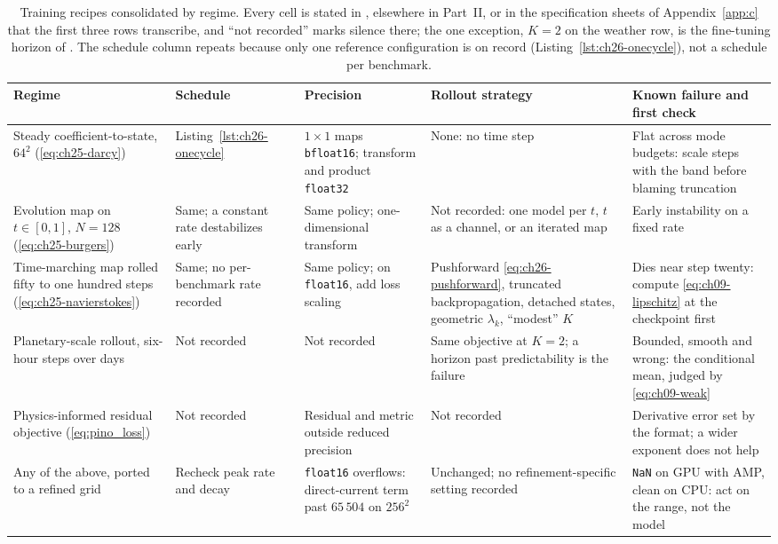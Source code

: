 \begin{table}[t]
\centering
\footnotesize
\caption{Training recipes consolidated by regime. Every cell is stated in
, elsewhere in Part~II, or in
the specification sheets of Appendix~\ref{app:c} that the first three rows transcribe,
and ``not recorded'' marks silence there; the one exception, $K=2$ on the weather
row, is the fine-tuning horizon of
. The schedule column
repeats because only one reference configuration is on record
(Listing~\ref{lst:ch26-onecycle}), not a schedule per benchmark.}
\label{tab:appd-recipes}
\begin{tabularx}{\textwidth}{@{}>{\raggedright\arraybackslash}p{}
  >{\raggedright\arraybackslash}p{}
  >{\raggedright\arraybackslash}p{}
  >{\raggedright\arraybackslash}p{}
  >{\raggedright\arraybackslash}X@{}}
\toprule
\textbf{Regime} & \textbf{Schedule} & \textbf{Precision} & \textbf{Rollout strategy} & \textbf{Known failure and first check} \\
\midrule
Steady coefficient-to-state, $64^2$ (\eqref{eq:ch25-darcy})
& Listing~\ref{lst:ch26-onecycle}
& $1\times1$ maps \texttt{bfloat16}; transform and product \texttt{float32}
& None: no time step
& Flat across mode budgets: scale steps with the band before blaming truncation \\
\addlinespace
Evolution map on $t\in[0,1]$, $N=128$ (\eqref{eq:ch25-burgers})
& Same; a constant rate destabilizes early
& Same policy; one-dimensional transform
& Not recorded: one model per $t$, $t$ as a channel, or an iterated map
& Early instability on a fixed rate \\
\addlinespace
Time-marching map rolled fifty to one hundred steps (\eqref{eq:ch25-navierstokes})
& Same; no per-benchmark rate recorded
& Same policy; on \texttt{float16}, add loss scaling
& Pushforward \eqref{eq:ch26-pushforward}, truncated backpropagation, detached states, geometric $\lambda_k$, ``modest'' $K$
& Dies near step twenty: compute \eqref{eq:ch09-lipschitz} at the checkpoint first \\
\addlinespace
Planetary-scale rollout, six-hour steps over days \cite{pathak2022fourcastnet}
& Not recorded
& Not recorded
& Same objective at $K=2$; a horizon past predictability is the failure
& Bounded, smooth and wrong: the conditional mean, judged by \eqref{eq:ch09-weak} \\
\addlinespace
Physics-informed residual objective (\eqref{eq:pino_loss})
& Not recorded
& Residual and metric outside reduced precision
& Not recorded
& Derivative error set by the format; a wider exponent does not help \\
\addlinespace
Any of the above, ported to a refined grid
& Recheck peak rate and decay
& \texttt{float16} overflows: direct-current term past $65\,504$ on $256^2$
& Unchanged; no refinement-specific setting recorded
& \texttt{NaN} on GPU with AMP, clean on CPU: act on the range, not the model \\
\bottomrule
\end{tabularx}
\end{table}
